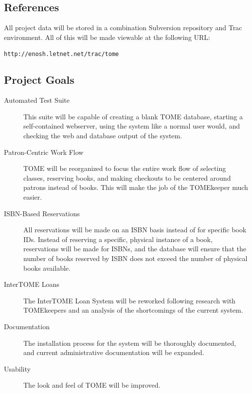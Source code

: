 \documentclass[12pt,titlepage]{article}
\begin{document}
\subsection{References}
All project data will be stored in a combination Subversion repository and Trac environment.  All of this will be made viewable at the following URL:

\texttt{http://enosh.letnet.net/trac/tome}
\subsection{Project Goals}
\begin{description}
	\item[Automated Test Suite] This suite will be capable of creating a blank TOME database, starting a self-contained webserver, using the system like a normal user would, and checking the web and database output of the system.
	\item[Patron-Centric Work Flow] TOME will be reorganized to focus the entire work flow of selecting classes, reserving books, and making checkouts to be centered around patrons instead of books.  This will make the job of the TOMEkeeper much easier.
	\item[ISBN-Based Reservations] All reservations will be made on an ISBN basis instead of for specific book IDs.  Instead of reserving a specific, physical instance of a book, reservations will be made for ISBNs, and the database will ensure that the number of books reserved by ISBN does not exceed the number of physical books available.
	\item[InterTOME Loans] The InterTOME Loan System will be reworked following research with TOMEkeepers and an analysis of the shortcomings of the current system.
	\item[Documentation] The installation process for the system will be thoroughly documented, and current administrative documentation will be expanded.
	\item[Usability] The look and feel of TOME will be improved.
\end{description}
\end{document}
